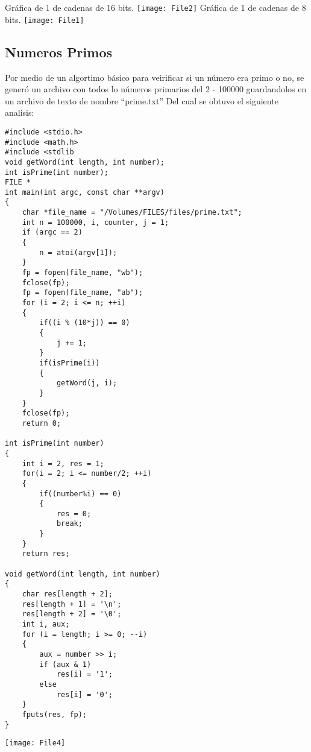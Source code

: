 \documentclass[a4paper]{article}
\begin{document}
            Gráfica de 1 de cadenas de 16 bits.\newline
            \texttt{[image: File2]}
            Gráfica de 1 de cadenas de 8 bits.\newline
            \texttt{[image: File1]}

            \subsection{Numeros Primos}
            Por medio de un algortimo básico para veirificar si un número era primo o no, se generó un archivo con todos lo números primarios del 2 - 100000 guardandolos en un archivo de texto de nombre ``prime.txt''
            Del cual se obtuvo el siguiente analisis:

            \begin{lstlisting}
#include <stdio.h>
#include <math.h>
#include <stdlib
void getWord(int length, int number);
int isPrime(int number);
FILE *
int main(int argc, const char **argv)
{
    char *file_name = "/Volumes/FILES/files/prime.txt";
    int n = 100000, i, counter, j = 1;
    if (argc == 2)
    {
        n = atoi(argv[1]);
    }
    fp = fopen(file_name, "wb");
    fclose(fp);
    fp = fopen(file_name, "ab");
    for (i = 2; i <= n; ++i)
    {
        if((i % (10*j)) == 0)
        {
            j += 1;
        }
        if(isPrime(i))
        {
            getWord(j, i);
        }
    }
    fclose(fp);
    return 0;

int isPrime(int number)
{
    int i = 2, res = 1;
    for(i = 2; i <= number/2; ++i)
    {
        if((number%i) == 0)
        {
            res = 0;
            break;
        }
    }
    return res;

void getWord(int length, int number)
{
    char res[length + 2];
    res[length + 1] = '\n';
    res[length + 2] = '\0';
    int i, aux;
    for (i = length; i >= 0; --i)
    {
        aux = number >> i;
        if (aux & 1)
            res[i] = '1';
        else
            res[i] = '0';
    }
    fputs(res, fp);
}
            \end{lstlisting}
            \texttt{[image: File4]}
\end{document}
